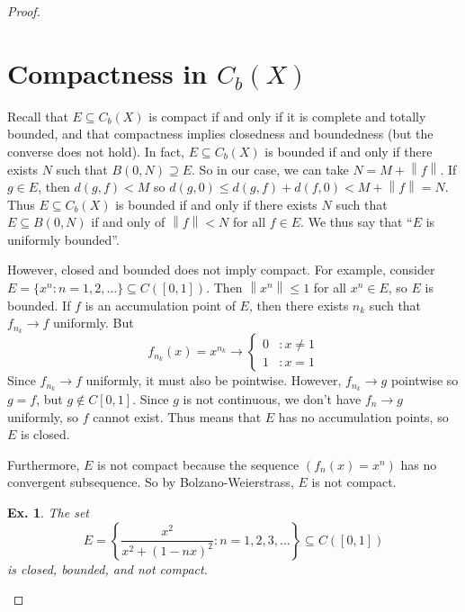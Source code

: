 \documentclass[12pt, a4paper]{book}
\newcommand{\norm}[1]{\left\lVert#1\right\rVert} %
\newtheorem{example}[theorem]{Ex.}
\theoremstyle{nonumberplain}
\newtheorem{proof}{Proof}
\begin{document}
\begin{proof}
\section{Compactness in $C_b(X)$}
Recall that $E\subseteq C_b(X)$ is compact if and only if it is complete and totally bounded, and that compactness implies closedness and boundedness (but the converse does not hold).
In fact, $E\subseteq C_b(X)$ is bounded if and only if there exists $N$ such that $B(0,N)\supseteq E$.
So in our case, we can take $N=M+\norm{f}$.
If $g\in E$, then $d(g,f)<M$ so $d(g,0)\leq d(g,f)+d(f,0)<M+\norm{f}=N$.
Thus $E\subseteq C_b(X)$ is bounded if and only if there exists $N$ such that $E\subseteq B(0,N)$ if and only of $\norm{f}<N$ for all $f\in E$.
We thus say that ``$E$ is uniformly bounded''.

However, closed and bounded does not imply compact.
For example, consider $E=\{x^n:n=1,2,\ldots\}\subseteq C([0,1])$.
Then $\norm{x^n}\leq 1$ for all $x^n\in E$, so $E$ is bounded.
If $f$ is an accumulation point of $E$, then there exists $n_k$ such that $f_{n_k}\to f$ uniformly.
But
\[f_{n_k}(x)=x^{n_k}\to
    \begin{cases}
        0 &:x\neq 1\\
        1 &:x = 1
    \end{cases}
\]
Since $f_{n_k}\to f$ uniformly, it must also be pointwise.
However, $f_{n_k}\to g$ pointwise so $g=f$, but $g\notin C[0,1]$.
Since $g$ is not continuous, we don't have $f_n\to g$ uniformly, so $f$ cannot exist.
Thus means that $E$ has no accumulation points, so $E$ is closed.

Furthermore, $E$ is not compact because the sequence $(f_n(x)=x^n)$ has no convergent subsequence.
So by Bolzano-Weierstrass, $E$ is not compact.
\begin{example}
    The set
    \[E=\left\{\frac{x^2}{x^2+(1-nx)^2}:n=1,2,3,\ldots\right\}\subseteq C([0,1])\]
    is closed, bounded, and not compact.
\end{example}

\end{proof}
\end{document}
